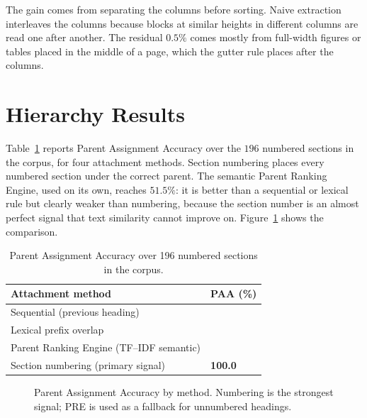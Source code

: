 \documentclass[12pt,a4paper,twoside,openright]{report}
\begin{document}
The gain comes from separating the columns before sorting. Naive extraction interleaves
the columns because blocks at similar heights in different columns are read one after
another. The residual $0.5\%$ comes mostly from full-width figures or tables placed in
the middle of a page, which the gutter rule places after the columns.

\section{Hierarchy Results}
Table~\ref{tab:paa} reports Parent Assignment Accuracy over the $196$ numbered sections
in the corpus, for four attachment methods. Section numbering places every numbered
section under the correct parent. The semantic Parent Ranking Engine, used on its own,
reaches $51.5\%$: it is better than a sequential or lexical rule but clearly weaker than
numbering, because the section number is an almost perfect signal that text similarity
cannot improve on. Figure~\ref{fig:paachart} shows the comparison.

\begin{table}[!htbp]
\centering
\caption{Parent Assignment Accuracy over 196 numbered sections in the corpus.}
\label{tab:paa}
\renewcommand{\arraystretch}{1.25}
{\small
\begin{tabularx}{\textwidth}{@{} X >{\centering\arraybackslash}p{3.0cm} @{}}
\toprule
Attachment method & PAA (\%) \\ \midrule
Sequential (previous heading) & 17.9 \\
Lexical prefix overlap & 34.7 \\
Parent Ranking Engine (TF--IDF semantic) & 51.5 \\
Section numbering (primary signal) & \textbf{100.0} \\ \bottomrule
\end{tabularx}}
\end{table}

\begin{figure}[!htbp]
\centering
{}
\caption{Parent Assignment Accuracy by method. Numbering is the strongest signal; PRE is
used as a fallback for unnumbered headings.}
\label{fig:paachart}
\end{figure}
\end{document}
